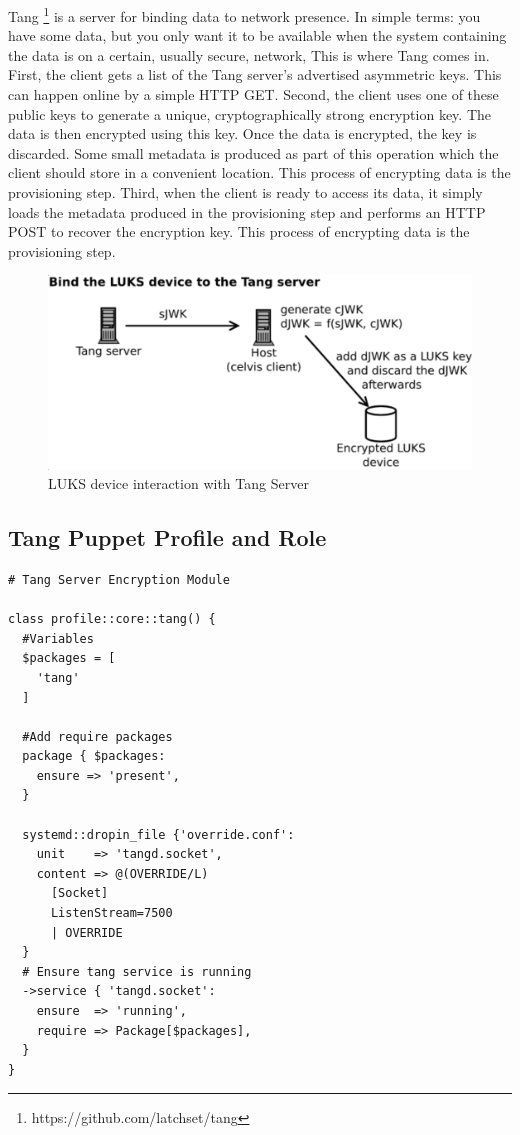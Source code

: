 Tang \footnote[3]{https://github.com/latchset/tang} is a server for binding data to network presence. In simple terms: you have some data, but you only want it to be available when the system containing the data is on a certain, usually secure, network, This is where Tang comes in.
First, the client gets a list of the Tang server's advertised asymmetric keys. This can happen online by a simple HTTP GET.
Second, the client uses one of these public keys to generate a unique, cryptographically strong encryption key. The data is then encrypted using this key. Once the data is encrypted, the key is discarded. Some small metadata is produced as part of this operation which the client should store in a convenient location. This process of encrypting data is the provisioning step.
Third, when the client is ready to access its data, it simply loads the metadata produced in the provisioning step and performs an HTTP POST to recover the encryption key. This process of encrypting data is the provisioning step.

\vskip 2cm
\begin{figure}
  \includegraphics[width=14cm]{images/image3.png}
  \centering
  \caption{LUKS device interaction with Tang Server}
\end{figure}

\newpage
\subsection{Tang Puppet Profile and Role}

\begin{lstlisting}
# Tang Server Encryption Module

class profile::core::tang() {
  #Variables
  $packages = [
    'tang'
  ]

  #Add require packages
  package { $packages:
    ensure => 'present',
  }

  systemd::dropin_file {'override.conf':
    unit    => 'tangd.socket',
    content => @(OVERRIDE/L)
      [Socket]
      ListenStream=7500
      | OVERRIDE
  }
  # Ensure tang service is running
  ->service { 'tangd.socket':
    ensure  => 'running',
    require => Package[$packages],
  }
}
\end{lstlisting}


